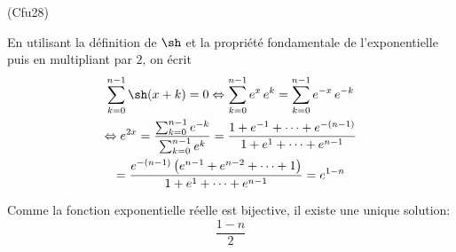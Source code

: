 \begin{tiny}(Cfu28)\end{tiny} En utilisant la définition de $\sh$ et la propriété fondamentale de l'exponentielle puis en multipliant par $2$, on écrit
\begin{multline*}
 \sum_{k=0}^{n-1}\sh(x+k) = 0
\Leftrightarrow
\sum_{k=0}^{n-1}e^x\,e^k = \sum_{k=0}^{n-1}e^{-x}\,e^{-k} \\
\Leftrightarrow
e^{2x} = \frac{\sum_{k=0}^{n-1}e^{-k}}{\sum_{k=0}^{n-1}e^{k}}
= \frac{1+e^{-1}+\cdots+e^{-(n-1)}}{1+e^{1}+\cdots+e^{n-1}}\\
= \frac{e^{-(n-1)}\left( e^{n-1} + e^{n-2} + \cdots + 1\right) }{1+e^{1}+\cdots+e^{n-1}}
= e^{1-n}
\end{multline*}

Comme la fonction exponentielle réelle est bijective, il existe une unique solution:
\begin{displaymath}
  \frac{1-n}{2}
\end{displaymath}
